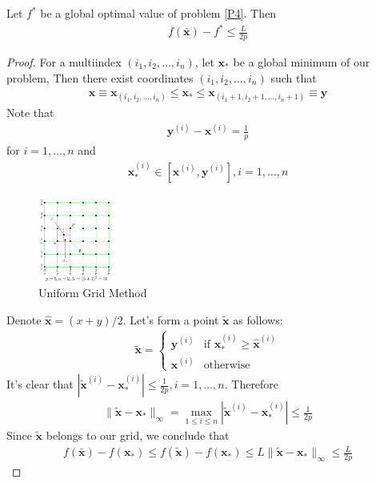 \begin{theorem}\label{T5}
    Let $f^*$ be a global optimal value of problem \ref{P4}. Then
    \begin{align*}
        f(\bar{\bm x})-f^*\le \frac{L}{2p}
    \end{align*}
\end{theorem}

\begin{proof}
    For a multiindex $(i_1,i_2,\dots,i_n)$, let $\bm x_*$ be a global minimum of our problem, Then there exist coordinates $(i_1,i_2,\dots,i_n)$ such that
    \begin{align*}
        \bm x\equiv \bm x_{(i_1,i_2,\dots,i_n)}\le \bm x_* \le \bm x_{(i_1+1,i_2+1,\dots,i_n+1)}\equiv \bm y
    \end{align*}
    Note that
    \begin{align*}
        \bm y^{(i)}-\bm x^{(i)}=\frac{1}{p}
    \end{align*}
    for $i=1,\dots,n$ and 
    \begin{align*}
        \bm x_*^{(i)}\in [\bm x^{(i)},\bm y^{(i)}],i=1,\dots,n
    \end{align*}

    \begin{figure}[!htb]
        \centering
        \includegraphics[width=0.22\textwidth]{pic/Opt1/Uniform Grid Method}
        \caption{Uniform Grid Method}
    \end{figure}
    Denote $\hat{\bm x}=(x+y)/2$. Let's form a point $\tilde{\bm x}$ as follows:
    \begin{align*}
        \tilde{\bm x}=\left\{ \begin{array}{ll}
            \bm y^{(i)} & \text{if }\bm x_*^{(i)}\ge \hat{\bm x}^{(i)}\\
            \bm x^{(i)} & \text{otherwise}
        \end{array} \right.
    \end{align*}
    It's clear that $|\tilde{\bm x}^{(i)}-\bm x_*^{(i)}|\le \frac{1}{2p}, i=1,\dots,n$. Therefore
    \begin{align*}
        \|\tilde{\bm x}-\bm x_*\|_\infty=\max_{1\le i\le n} |\tilde{\bm x}^{(i)}-\bm x_*^{(i)}|\le \frac{1}{2p}
    \end{align*}
    Since $\tilde{\bm x}$ belongs to our grid, we conclude that
    \begin{align*}
        f(\bar{\bm x})-f(\bm x_*)\le f(\tilde{\bm x})-f(\bm x_*)\le L\|\tilde{\bm x}-\bm x_*\|_\infty\le \frac{L}{2p}
    \end{align*}
\end{proof}


